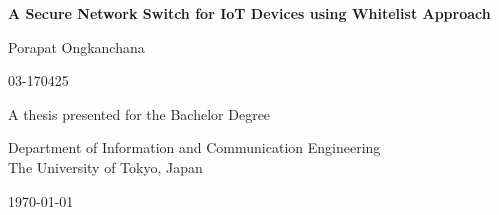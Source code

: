 \begin{titlepage}
    \begin{center}
            \vspace*{1cm}
            \Huge 
            \textbf{A Secure Network Switch for IoT Devices using Whitelist Approach}
            
            \vspace{4.0cm} 
            Porapat Ongkanchana 

            \vspace{0.6cm} 
            \Large 03-170425
            \vfill
            
            \Huge
            A thesis presented for the Bachelor Degree 
            \vspace{1cm}

            \Large 
            Department of Information and Communication Engineering \\
            The University of Tokyo, Japan
            
            \today
    \end{center}
\end{titlepage}